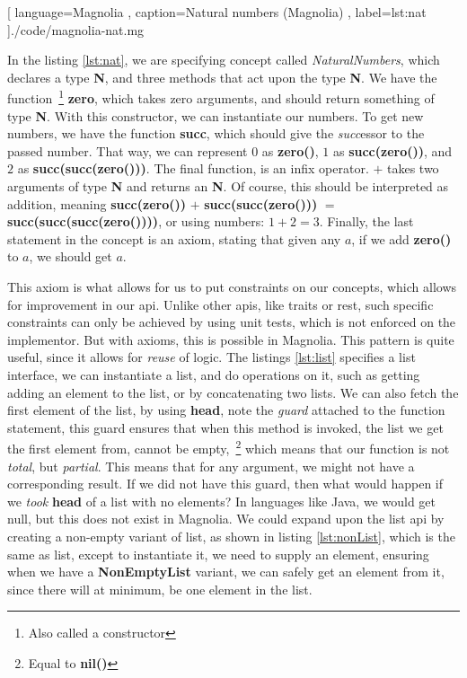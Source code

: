 \begin{center}
  
    [ language=Magnolia
    , caption={Natural numbers (Magnolia)}
    , label=lst:nat
    ]{./code/magnolia-nat.mg}
\end{center}

In the listing \ref{lst:nat}, we are specifying concept called
\textit{NaturalNumbers}, which declares a type \textbf{N}, and three methods
that act upon the type \textbf{N}. We have the function~\footnote{Also called a constructor}
\textbf{zero}, which takes zero arguments, and should return something of type
\textbf{N}. With this constructor, we can instantiate our numbers. To get new
numbers, we have the function \textbf{succ}, which should give the
\textit{succ}essor to the passed number. That way, we can represent $0$ as
\textbf{zero()}, $1$ as \textbf{succ(zero())}, and $2$ as
\textbf{succ(succ(zero()))}. The final function, is an infix operator. $+$ takes
two arguments of type \textbf{N} and returns an \textbf{N}. Of course, this
should be interpreted as addition, meaning \textbf{succ(zero())} $+$
\textbf{succ(succ(zero()))} $=$ \textbf{succ(succ(succ(zero())))}, or using
numbers: $1 + 2 = 3$. Finally, the last statement in the concept is an axiom,
stating that given any $a$, if we add \textbf{zero()} to $a$, we should get $a$.

This axiom is what allows for us to put constraints on our concepts, which
allows for improvement in our \gls*{api}. Unlike other \gls*{api}s, like traits or
\gls*{rest}, such specific constraints can only be achieved by using unit tests,
which is not enforced on the implementor. But with axioms, this is possible in
Magnolia. This pattern is quite useful, since it allows for \textit{reuse} of
logic. The listings \ref{lst:list} specifies a list interface, we can
instantiate a list, and do operations on it, such as getting adding an element to
the list, or by concatenating two lists. We can also fetch the first element of
the list, by using \textbf{head}, note the \textit{guard} attached to the
function statement, this guard ensures that when this method is invoked, the
list we get the first element from, cannot be empty,~\footnote{Equal to \textbf{nil()}}
which means that our function is not \textit{total}, but \textit{partial}. This
means that for any argument, we might not have a corresponding result. If we did
not have this guard, then what would happen if we \textit{took} \textbf{head} of a list
with no elements? In languages like Java, we would get null, but this does not
exist in Magnolia. We could expand upon the list \gls*{api} by creating a
non-empty variant of list, as shown in listing \ref{lst:nonList}, which is the
same as list, except to instantiate it, we need to supply an element, ensuring
when we have a \textbf{NonEmptyList} variant, we can safely get an element from
it, since there will at minimum, be one element in the list.

